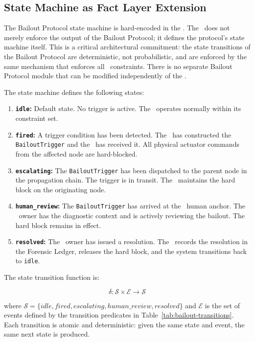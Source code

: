 \subsection{State Machine as Fact Layer Extension}
\label{sec:state-machine}

The Bailout Protocol state machine is hard-encoded in the \fact. The \fact\ does not merely enforce the output of the Bailout Protocol; it defines the protocol's state machine itself. This is a critical architectural commitment: the state transitions of the Bailout Protocol are deterministic, not probabilistic, and are enforced by the same mechanism that enforces all \fact\ constraints. There is no separate Bailout Protocol module that can be modified independently of the \fact.

The state machine defines the following states:

\begin{enumerate}
\item \textbf{\texttt{idle}:} Default state. No trigger is active. The \bounds\ operates normally within its constraint set.
\item \textbf{\texttt{fired}:} A trigger condition has been detected. The \bounds\ has constructed the \texttt{BailoutTrigger} and the \fact\ has received it. All physical actuator commands from the affected node are hard-blocked.
\item \textbf{\texttt{escalating}:} The \texttt{BailoutTrigger} has been dispatched to the parent node in the propagation chain. The trigger is in transit. The \fact\ maintains the hard block on the originating node.
\item \textbf{\texttt{human\_review}:} The \texttt{BailoutTrigger} has arrived at the \purpose\ human anchor. The \purpose\ owner has the diagnostic context and is actively reviewing the bailout. The hard block remains in effect.
\item \textbf{\texttt{resolved}:} The \purpose\ owner has issued a resolution. The \fact\ records the resolution in the Forensic Ledger, releases the hard block, and the system transitions back to \texttt{idle}.
\end{enumerate}

The state transition function is:

\begin{equation}
\delta: \mathcal{S} \times \mathcal{E} \rightarrow \mathcal{S}
\end{equation}

where $\mathcal{S} = \{idle, fired, escalating, human\_review, resolved\}$ and $\mathcal{E}$ is the set of events defined by the transition predicates in Table~\ref{tab:bailout-transitions}. Each transition is atomic and deterministic: given the same state and event, the same next state is produced.

